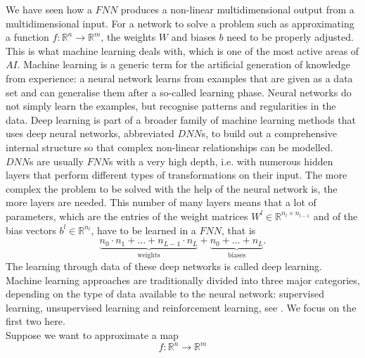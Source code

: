 We have seen how a $FNN$ produces a non-linear multidimensional output from a multidimensional input. For a network to solve a problem such as approximating a function $f \colon \mathbb{R}^n \to \mathbb{R}^m$, the weights $W$ and biases $b$ need to be properly adjusted. This is what machine learning deals with, which is one of the most active areas of $AI$. Machine learning is a generic term for the artificial generation of knowledge from experience: a neural network learns from examples that are given as a data set and can generalise them after a so-called learning phase. Neural networks do not simply learn the examples, but recognise patterns and regularities in the data. Deep learning is part of a broader family of machine learning methods that uses deep neural networks, abbreviated $DNN$s, to build out a comprehensive internal structure so that complex non-linear relationships can be modelled. $DNN$s are usually $FNN$s with a very high depth, i.e. with numerous hidden layers that perform different types of transformations on their input. The more complex the problem to be solved with the help of the neural network is, the more layers are needed. This number of many layers means that a lot of parameters, which are the entries of the weight matrices $W^l \in \mathbb{R}^{n_l \times n_{l-1}}$ and of the bias vectors $b^l \in \mathbb{R}^{n_l}$, have to be learned in a $FNN$, that is
\begin{equation*}
    \underbrace{n_0 \cdot n_1 + \ldots + n_{L-1} \cdot n_L}_{\text{weights}} + \underbrace{n_0 + \ldots + n_L}_{\text{biases}}.
\end{equation*}
The learning through data of these deep networks is called deep learning. Machine learning approaches are traditionally divided into three major categories, depending on the type of data available to the neural network: supervised learning, unsupervised learning and reinforcement learning, see \cite[pp.~1-3]{Bishop:2006}. We focus on the first two here. \\
Suppose we want to approximate a map
\begin{equation*}
    f \colon \mathbb{R}^n \to \mathbb{R}^m
\end{equation*}
